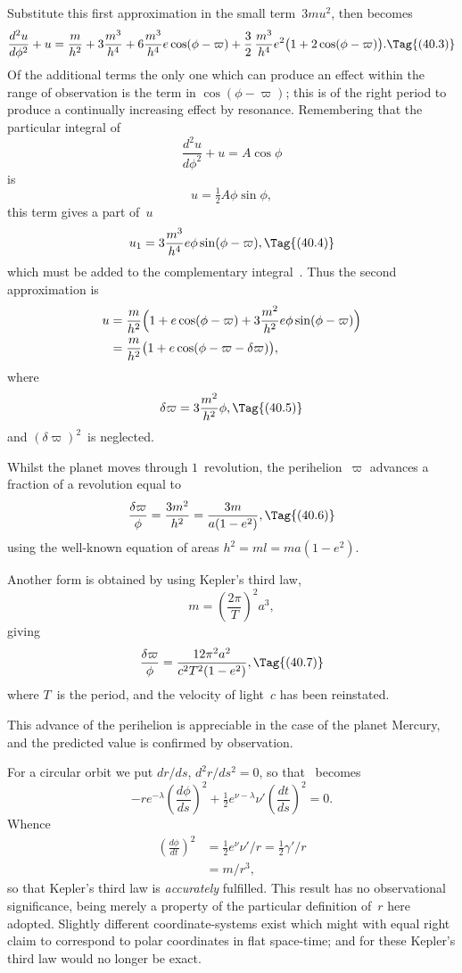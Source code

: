 \documentclass[12pt]{book}
\begin{document}
Substitute this first approximation in the small term~$3mu^{2}$, then 
becomes
\[
\frac{d^{2}u}{d\phi^{2}} + u = \frac{m}{h^{2}} + 3\frac{m^{3}}{h^{4}}
+ 6\frac{m^{3}}{h^{4}} e\cos(\phi - \varpi)
+ \frac{3}{2}\, \frac{m^{3}}{h^{4}} e^{2} \bigl(1 + 2\cos(\phi - \varpi)\bigr).
\Tag{(40.3)}
\]
Of the additional terms the only one which can produce an effect within the
range of observation is the term in $\cos(\phi - \varpi)$; this is of the right period to
produce a continually increasing effect by resonance. Remembering that the
particular integral of
\[
\frac{d^{2} u}{d\phi^{2}} + u = A\cos\phi
\]
is
\[
u = \tfrac{1}{2}A \phi \sin\phi,
\]
this term gives a part of~$u$
\[
u_{1} = 3\frac{m^{3}}{h^{4}} e\phi \sin(\phi - \varpi),
\Tag{(40.4)}
\]
which must be added to the complementary integral~. Thus the second
approximation is
\begin{align*}
  u &= \frac{m}{h^{2}} \Bigl(1 + e\cos(\phi - \varpi) + 3 \frac{m^{2}}{h^{2}} e\phi \sin(\phi - \varpi)\Bigr) \\
  &= \frac{m}{h^{2}} \bigl(1 + e\cos(\phi - \varpi - \delta\varpi)\bigr),
\end{align*}
where
\[
\delta\varpi = 3\frac{m^{2}}{h^{2}} \phi,
\Tag{(40.5)}
\]
and $(\delta\varpi)^{2}$~is neglected.

Whilst the planet moves through $1$~revolution, the perihelion~$\varpi$ advances
a fraction of a revolution equal to
\[
\frac{\delta\varpi}{\phi} = \frac{3m^{2}}{h^{2}} = \frac{3m}{a(1 - e^{2})},
\Tag{(40.6)}
\]
using the well-known equation of areas $h^{2} = ml = ma(1 - e^{2})$.%

Another form is obtained by using Kepler's third law,
%
\[
m = \left(\frac{2\pi}{T}\right)^{2} a^{3},
\]
giving
\[
\frac{\delta\varpi}{\phi} = \frac{12\pi^{2} a^{2}}{c^{2} T^{2}(1 - e^{2})},
\Tag{(40.7)}
\]
where $T$~is the period, and the velocity of light~$c$ has been reinstated.

This advance of the perihelion is appreciable in the case of the planet
Mercury, and the predicted value is confirmed by observation.

For a circular orbit we put $dr/ds$, $d^{2}r/ds^{2} = 0$, so that ~becomes
\[
-re^{-\lambda} \left(\frac{d\phi}{ds}\right)^{2} + \tfrac{1}{2} e^{\nu-\lambda} \nu' \left(\frac{dt}{ds}\right)^{2} = 0.
\]
Whence
\begin{align*}
  \left(\frac{d\phi}{dt}\right)^{2}
  &= \tfrac{1}{2} e^{\nu} \nu'/r = \tfrac{1}{2} \gamma'/r \\
  &= m/r^{3},
\end{align*}
so that Kepler's third law is \emph{accurately} fulfilled. This result has no observational
significance, being merely a property of the particular definition of~$r$
here adopted. Slightly different coordinate-systems exist which might with
equal right claim to correspond to polar coordinates in flat space-time; and
for these Kepler's third law would no longer be exact.
\end{document}
